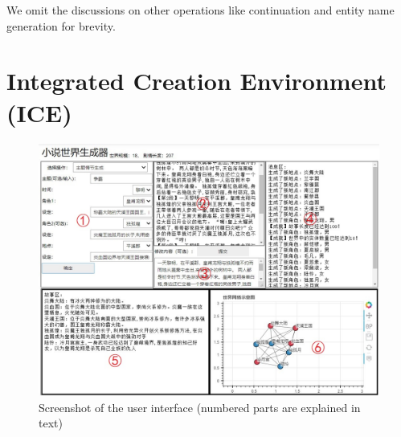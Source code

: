 \documentclass{article}
\begin{document}
We omit the discussions on other operations like continuation and entity name 
generation for brevity.




\section{Integrated Creation Environment (ICE)}

\begin{figure}[t]
    \centering
    \includegraphics[width=0.95\columnwidth]{figures/environment.jpg}
    \caption{Screenshot of the user interface (numbered parts are 
explained in text)}
    \label{fig:environment}
\end{figure}
\end{document}
